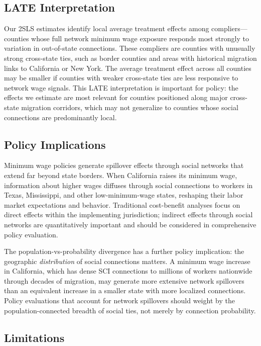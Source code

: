 \documentclass[12pt]{article}
\begin{document}
\subsection{LATE Interpretation}

Our 2SLS estimates identify local average treatment effects among compliers---counties whose full network minimum wage exposure responds most strongly to variation in out-of-state connections. These compliers are counties with unusually strong cross-state ties, such as border counties and areas with historical migration links to California or New York. The average treatment effect across all counties may be smaller if counties with weaker cross-state ties are less responsive to network wage signals. This LATE interpretation is important for policy: the effects we estimate are most relevant for counties positioned along major cross-state migration corridors, which may not generalize to counties whose social connections are predominantly local.

\subsection{Policy Implications}

Minimum wage policies generate spillover effects through social networks that extend far beyond state borders. When California raises its minimum wage, information about higher wages diffuses through social connections to workers in Texas, Mississippi, and other low-minimum-wage states, reshaping their labor market expectations and behavior. Traditional cost-benefit analyses focus on direct effects within the implementing jurisdiction; indirect effects through social networks are quantitatively important and should be considered in comprehensive policy evaluation.

The population-vs-probability divergence has a further policy implication: the geographic \textit{distribution} of social connections matters. A minimum wage increase in California, which has dense SCI connections to millions of workers nationwide through decades of migration, may generate more extensive network spillovers than an equivalent increase in a smaller state with more localized connections. Policy evaluations that account for network spillovers should weight by the population-connected breadth of social ties, not merely by connection probability.

\subsection{Limitations}
\end{document}
